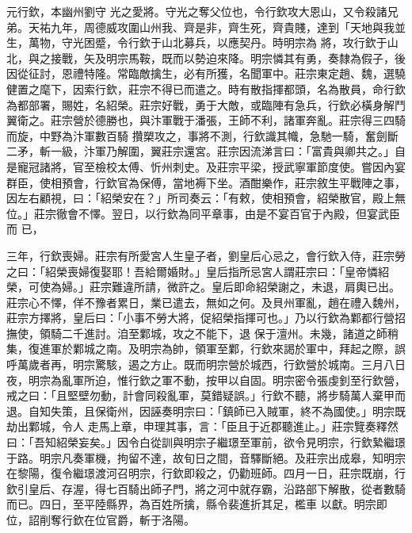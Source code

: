 
\begin{pinyinscope}

 元行欽，本幽州劉守
 光之愛將。守光之奪父位也，令行欽攻大恩山，又令殺諸兄弟。天祐九年，周德威攻圍山州我、齊是非，齊生死，齊貴賤，達到「天地與我並生，萬物，守光困蹙，令行欽于山北募兵，以應契丹。時明宗為
 將，攻行欽于山北，與之接戰，矢及明宗馬鞍，既而以勢迫來降。明宗憐其有勇，奏隸為假子，後因從征討，恩禮特隆。常臨敵擒生，必有所獲，名聞軍中。莊宗東定趙、魏，選驍健置之麾下，因索行欽，莊宗不得已而遣之。時有散指揮都頭，名為散員，命行欽為都部署，賜姓，名紹榮。莊宗好戰，勇于大敵，或臨陣有急兵，行欽必橫身解鬥翼衛之。莊宗營於德勝也，與汴軍戰于潘張，王師不利，諸軍奔亂。莊宗得三四騎而旋，中野為汴軍數百騎
 攢槊攻之，事將不測，行欽識其幟，急馳一騎，奮劍斷二矛，斬一級，汴軍乃解圍，翼莊宗還宮。莊宗因流涕言曰：「富貴與卿共之。」自是寵冠諸將，官至檢校太傅、忻州刺史。及莊宗平梁，授武寧軍節度使。嘗因內宴群臣，使相預會，行欽官為保傅，當地褥下坐。酒酣樂作，莊宗敘生平戰陣之事，因左右顧視，曰：「紹榮安在？」所司奏云：「有敕，使相預會，紹榮散官，殿上無位。」莊宗徹會不懌。翌日，以行欽為同平章事，由是不宴百官于內殿，但宴武臣而
 已，



 三年，行欽喪婦。莊宗有所愛宮人生皇子者，劉皇后心忌之，會行欽入侍，莊宗勞之曰：「紹榮喪婦復娶耶！吾給爾婚財。」皇后指所忌宮人謂莊宗曰：「皇帝憐紹榮，可使為婦。」莊宗難違所請，微許之。皇后即命紹榮謝之，未退，肩輿已出。莊宗心不懌，佯不豫者累日，業已遣去，無如之何。及貝州軍亂，趙在禮入魏州，莊宗方擇將，皇后曰：「小事不勞大將，促紹榮指揮可也。」乃以行欽為鄴都行營招撫使，領騎二千進討。洎至鄴城，攻之不能下，退
 保于澶州。未幾，諸道之師稍集，復進軍於鄴城之南。及明宗為帥，領軍至鄴，行欽來謁於軍中，拜起之際，誤呼萬歲者再，明宗驚駭，遏之方止。既而明宗營於城西，行欽營於城南。三月八日夜，明宗為亂軍所迫，惟行欽之軍不動，按甲以自固。明宗密令張虔釗至行欽營，戒之曰：「且堅壁勿動，計會同殺亂軍，莫錯疑誤。」行欽不聽，將步騎萬人棄甲而退。自知失策，且保衛州，因誣奏明宗曰：「鎮師已入賊軍，終不為國使。」明宗既劫出鄴城，令人
 走馬上章，申理其事，言：「臣且于近郡聽進止。」莊宗覽奏釋然曰：「吾知紹榮妄矣。」因令白從訓與明宗子繼璟至軍前，欲令見明宗，行欽縶繼璟于路。明宗凡奏軍機，拘留不達，故旬日之間，音驛斷絕。及莊宗出成皋，知明宗在黎陽，復令繼璟渡河召明宗，行欽即殺之，仍勸班師。四月一日，莊宗既崩，行欽引皇后、存渥，得七百騎出師子門，將之河中就存霸，沿路部下解散，從者數騎而已。四日，至平陸縣界，為百姓所擒，縣令裴進折其足，檻車
 以獻。明宗即位，詔削奪行欽在位官爵，斬于洛陽。




\end{pinyinscope}
